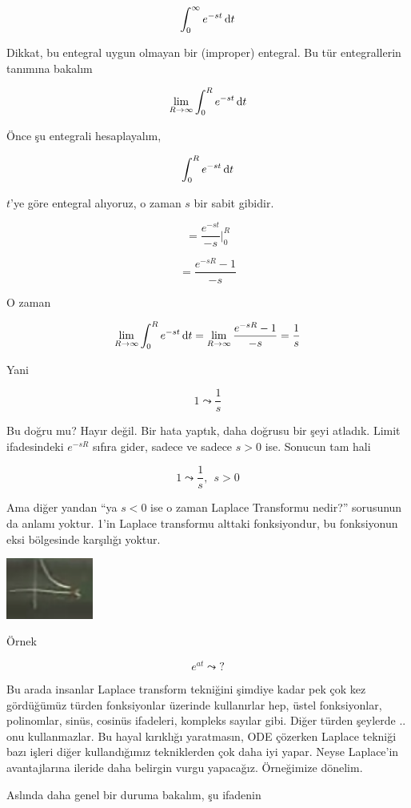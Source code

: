 \documentclass[12pt,fleqn]{article}\usepackage{../../common}
\begin{document}
$$ \int_0^{\infty} e^{-st} \,\mathrm{d} t $$

Dikkat, bu entegral uygun olmayan bir (improper) entegral. Bu tür
entegrallerin tanımına bakalım

$$ \lim_{R \to \infty}  \int_{0}^{R} e^{-st} \,\mathrm{d} t  $$

Önce şu entegrali hesaplayalım, 

$$  \int_{0}^{R} e^{-st} \,\mathrm{d} t $$

$t$'ye göre entegral alıyoruz, o zaman $s$ bir sabit gibidir. 

$$  = \frac{ e^{-st}}{-s}  \bigg|_{0}^{R} $$

$$ = \frac{e^{-sR} - 1}{-s} $$

O zaman 

$$ \lim_{R \to \infty}  \int_{0}^{R} e^{-st} \,\mathrm{d} t  = 
\lim_{R \to \infty} \frac{e^{-sR} - 1}{-s}  = \frac{1}{s}
$$

Yani 

$$ 1 \leadsto \frac{1}{s} $$

Bu doğru mu? Hayır değil. Bir hata yaptık, daha doğrusu bir şeyi
atladık. Limit ifadesindeki $e^{-sR}$ sıfıra gider, sadece ve sadece $s >
0$ ise. Sonucun tam hali 

$$ 1 \leadsto \frac{1}{s}, \ \ s > 0 $$

Ama diğer yandan ``ya $s < 0$ ise o zaman Laplace Transformu nedir?''
sorusunun da anlamı yoktur. 1'in Laplace transformu alttaki fonksiyondur,
bu fonksiyonun eksi bölgesinde karşılığı yoktur. 

\includegraphics[height=2cm]{19_2.png}

Örnek 

$$ e^{at} \leadsto ? $$

Bu arada insanlar Laplace transform tekniğini şimdiye kadar pek çok kez
gördüğümüz türden fonksiyonlar üzerinde kullanırlar hep, üstel fonksiyonlar,
polinomlar, sinüs, cosinüs ifadeleri, kompleks sayılar gibi. Diğer türden
şeylerde .. onu kullanmazlar. Bu hayal kırıklığı yaratmasın, ODE çözerken
Laplace tekniği bazı işleri diğer kullandığımız tekniklerden çok daha iyi
yapar. Neyse Laplace'in avantajlarına ileride daha belirgin vurgu
yapacağız. Örneğimize dönelim. 

Aslında daha genel bir duruma bakalım, şu ifadenin
\end{document}
